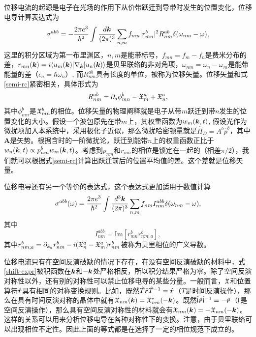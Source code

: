 位移电流的起源是电子在光场的作用下从价带跃迁到导带时发生的位置变化，位移电导计算表达式为
\begin{equation}
\sigma^{abb}=-\frac{2\pi e^3}{\hbar^2}\int \frac{d\boldsymbol{k}}{(2\pi)^3}\sum_{n,m}f_{mn}|r^b_{mn}|^2 R_{nm}^{ab} \delta(\omega_{nm}-\omega),\label{shift-expr}
\end{equation}
这里的积分区域为第一布里渊区，$n,m$是能带标号，$f_{mn}=f_m-f_n$是费米分布的差，$r_{mn}(\boldsymbol{k})=i \langle u_m(\boldsymbol{k})|\nabla_{\boldsymbol{k}}|u_n(\boldsymbol{k}) \rangle$是贝里联络的非对角项，$\omega_{nm}=\omega_n-\omega_m$是能带能量的差（$\epsilon_n=\hbar\omega_n$）, 而$R_{nm}^{ab}$具有长度的单位，被称为位移矢量。位移矢量和式\ref{semi-rc}紧密相关，具体形式为
\begin{equation}
R_{nm}^{ab}=\partial_a \phi_{mn}^{b}-\mathfrak{X}_m^a+\mathfrak{X}_n^a,
\end{equation}
其中$\phi_{mn}^{b}$是$\mathfrak{X}_{mn}^{b}$的相位。位移矢量的物理阐释就是电子从带$m$跃迁到带$n$发生的位置变化的大小。假设一个波包原先在带$m$上，其权重函数为$w_m(\boldsymbol{k},t)$, 假设光作为微扰项加入本系统中，采用极化子近似，那么微扰哈密顿量就是$\hat{H}_D=A^b\hat{p}^b$，其中$\boldsymbol{A}$是矢势。根据含时的一阶微扰论，跃迁到能带$n$上的权重函数正比于$w_n(\boldsymbol{k}, t)\propto p^b_{nm}w_m(\boldsymbol{k}, t)$。考虑到$p_{nm}$和$r_{nm}$的相位是锁定在一起的（相差$\pi/2$），我们就可以根据式\ref{semi-rc}计算出跃迁前后的位置平均值的差。这个差就是位移矢量。

位移电导还有另一个等价的表达式，这个表达式更加适用于数值计算
\begin{equation}
	\sigma^{abb}(\omega)=\frac{2\pi e^{3}}{\hbar^{2}}\int\frac{d^{3}\boldsymbol{k}}{(2\pi)^{3}}\sum_{n,m}f_{nm}I_{nm}^{abb}\delta(\omega_{nm}-\omega),\label{eq:shift-current}
\end{equation}
其中
\begin{equation}
I_{nm}^{abb}=\text{Im}[r_{mn}^{b}r_{nm;a}^{b}],\label{eq:shift-integrand}
\end{equation}
其中$r_{nm;a}^{b}=\partial_{k_{a}}r_{nm}^{b}-i(\mathfrak{X}_{n}^{a}-\mathfrak{X}_{m}^{a})r_{nm}^{b}$被称为贝里相位的广义导数。

位移电流只有在空间反演破缺的情况下存在，在没有空间反演破缺的材料中，式\ref{shift-expr}被积函数在$\boldsymbol{k}$和$-\boldsymbol{k}$处严格相反，所以积分结果严格为零。除了空间反演对称性以外，还有别的对称性可以禁止位移电导的某些分量。一般而言，$\mathfrak{X}$和位置算符$\hat{\boldsymbol{r}}$具有相同的对称变换规则。比如，既然$\hat{T}\hat{\boldsymbol{r}}\hat{T}^{-1}=\hat{\boldsymbol{r}}$（$T$是时间反演操作），那么在具有时间反演对称的晶体中就有$\mathfrak{X}_{nm}(\boldsymbol{k})=\mathfrak{X}_{nm}^*(-\boldsymbol{k})$。既然$\hat{\mathfrak{i}} \hat{\boldsymbol{r}} \hat{\mathfrak{i}}^{-1}=-\hat{\boldsymbol{r}}$（$\mathfrak{i}$是空间反演操作），那么具有空间反演对称性的材料就会有$\mathfrak{X}_{nm}(\boldsymbol{k})=-\mathfrak{X}_{nm}(-\boldsymbol{k})$。这样的关系可以用来分析位移电导在各种对称性下的变换。注意，由于贝里联络可以出现相位不定性。因此上面的等式都是在选择了一定的相位规范下成立的。

